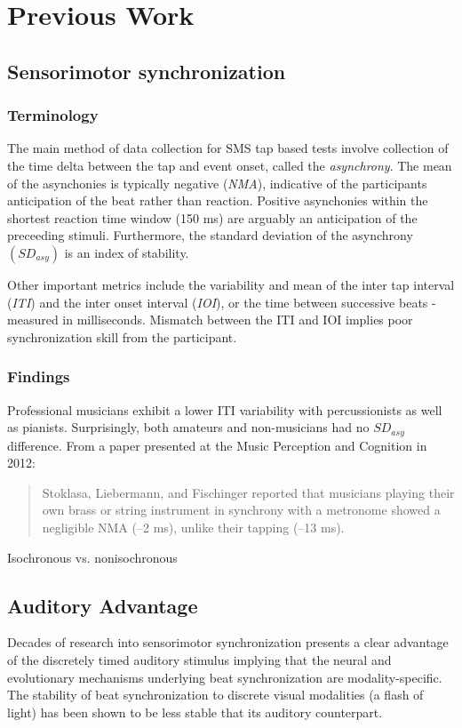 \chapter{Previous Work}

\section{Sensorimotor synchronization}
\subsection{Terminology}
The main method of data collection for SMS tap based tests involve collection of the time delta between the tap and event onset, called the \textit{asynchrony}. The mean of the asynchonies is typically negative (\textit{NMA}), indicative of the participants anticipation of the beat rather than reaction. Positive asynchonies within the shortest reaction time window (150 ms) are arguably an anticipation of the preceeding stimuli. Furthermore, the standard deviation of the asynchrony $(SD_{asy})$ is an index of stability.  \cite{repp2013sensorimotor}

Other important metrics include the variability and mean of the inter tap interval (\textit{ITI}) and the inter onset interval (\textit{IOI}), or the time between successive beats - measured in milliseconds. Mismatch between the ITI and IOI implies poor synchronization skill from the participant. 

\subsection{Findings}
Professional musicians exhibit a lower ITI variability with percussionists as well as pianists. Surprisingly, both amateurs and non-musicians had no $SD_{asy}$ difference. From a paper presented at the Music Perception and Cognition in 2012:
\begin{quotation}
    Stoklasa, Liebermann, and Fischinger reported that musicians playing their own brass or string instrument in synchrony with a metronome showed a negligible NMA (–2 ms), unlike their tapping (–13 ms). \cite{repp2013sensorimotor}
\end{quotation}


Isochronous vs. nonisochronous ~\cite{polak2016both}


\section{Auditory Advantage}
Decades of research into sensorimotor synchronization presents a clear advantage of the discretely timed auditory stimulus implying that the neural and evolutionary mechanisms underlying beat synchronization are modality-specific.
~\cite{gan2015synchronization} The stability of beat synchronization to discrete visual modalities (a flash of light) has been shown to be less stable that its auditory counterpart.

